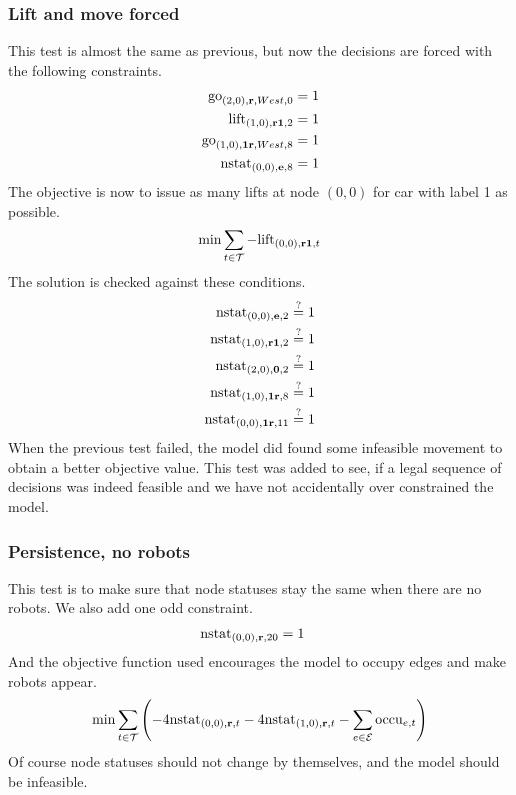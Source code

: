 \subsubsection{Lift and move forced}
This test is almost the same as previous, but now the decisions are forced with
the following constraints.
\begin{align}
    \mathrm{go}_{(2,0),\text{\bf r},West,0} &= 1\\
    \mathrm{lift}_{(1,0),\text{\bf r1},2} &= 1\\
    \mathrm{go}_{(1,0),\text{\bf 1r},West,8} &= 1\\
    \mathrm{nstat}_{(0,0),\text{\bf e},8} &= 1
\end{align}
The objective is now to issue as many lifts at node $(0,0)$ for car with label 1
as possible.
\begin{align}
    \min \sum_{t \in \mathcal{T}} -\mathrm{lift}_{(0,0), \text{\bf r1}, t}
\end{align}
The solution is checked against these conditions.
\begin{align}
    \mathrm{nstat}_{(0,0), \text{\bf e}, 2} &\overset{?}{=} 1\\
    \mathrm{nstat}_{(1,0), \text{\bf r1}, 2} &\overset{?}{=} 1\\
    \mathrm{nstat}_{(2,0), \text{\bf 0}, 2} &\overset{?}{=} 1\\
    \mathrm{nstat}_{(1,0), \text{\bf 1r}, 8} &\overset{?}{=} 1\\
    \mathrm{nstat}_{(0,0), \text{\bf 1r}, 11} &\overset{?}{=} 1
\end{align}
When the previous test failed, the model did found some infeasible movement to
obtain a better objective value. This test was added to see, if a legal
sequence of decisions was indeed feasible and we have not accidentally over constrained the
model.
\subsubsection{Persistence, no robots}
This test is to make sure that node statuses stay the same when there are no
robots.
We also add one odd constraint.
\begin{align}
    \mathrm{nstat}_{(0,0),\text{\bf r},20} &= 1
\end{align}
And the objective function used encourages the model to occupy edges and
make robots appear.
\begin{align}
    \min \sum_{t \in \mathcal{T}}\left( -4\mathrm{nstat}_{(0,0), \text{\bf r}, t}
    -4\mathrm{nstat}_{(1,0),\text{\bf r},t} -\sum_{e \in \mathcal{E}} \mathrm{occu}_{e,t} \right)
\end{align}
Of course node statuses should not change by themselves, and the model should be
infeasible.


